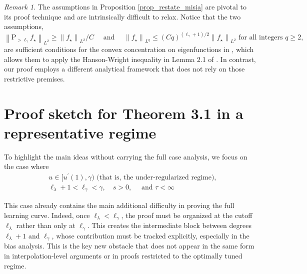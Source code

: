 \documentclass{article}
\theoremstyle{plain}
\theoremstyle{definition}
\theoremstyle{remark}
\newtheorem{remark}[theorem]{Remark}
\begin{document}
\begin{appendix}
\begin{remark}
    The assumptions in Proposition \ref{prop_restate_misia} are pivotal to its proof technique and are intrinsically difficult to relax. Notice that the two assumptions,
$$
\left\|\mathrm{P}_{>\ell_{\gamma}} f_{\star}\right\|_{L^2} \geq\left\|f_{\star}\right\|_{L^2} / C 
\quad \text{ and } \quad 
\left\|f_{\star}\right\|_{L^q} \leq (C q)^{(\ell_{\gamma}+1) / 2}\left\|f_{\star}\right\|_{L^2} \text{ for all integers } q \geq 2,
$$
are sufficient conditions for the convex concentration on eigenfunctions in \cite{cheng2022dimension}, which allows them to apply the Hanson-Wright inequality in Lemma 2.1 of \cite{cheng2022dimension}.
In contrast, our proof employs a different analytical framework that does not rely on those restrictive premises.
\end{remark}









\section{Proof sketch for Theorem 3.1 in a representative regime}\label{append_sketch_proof_main_results}



To highlight the main ideas without carrying the full case analysis, we focus on the case where
\begin{equation}\label{eqn_sketch_0}
    \begin{aligned}
    &~ u \in [u^{\prime}(1), \gamma) \text{ (that is, the under-regularized regime), }\\
    &~ \ell_{\lambda}+1 < \ell_{\gamma} < \gamma, \quad s>0, \quad \text{ and } \tau < \infty
\end{aligned}
\end{equation}

This case already contains the main additional difficulty in proving the full learning curve.
Indeed, once $\ell_{\lambda}<\ell_{\gamma}$, the proof must be organized at the cutoff $\ell_{\lambda}$ rather than only at $\ell_{\gamma}$.  
This creates the intermediate block between degrees $\ell_{\lambda}+1$ and $\ell_{\gamma}$, whose contribution must be tracked explicitly, especially in the bias analysis. 
This is the key new obstacle that does not appear in the same form in interpolation-level arguments or in proofs restricted to the optimally tuned regime.




\end{appendix}
\end{document}

